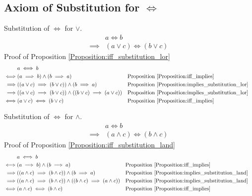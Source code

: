 \subsection{Axiom of Substitution for $\iff$}
\begin{prop}
\label{Proposition:iff_substitution_lor}
Substitution of $\iff$ for $\lor$.
\begin{align*}
& a \iff b \\
\implies & (a \lor c) \iff (b \lor c)
\end{align*}
Proof of Proposition \ref{Proposition:iff_substitution_lor}
\begin{align*}
& a \iff b \\
\iff & (a \implies b) \land (b \implies a)
& & \text{Proposition \ref{Proposition:iff_implies}} \\
\implies & ((a \lor c) \implies (b \lor c)) \land (b \implies a)
& & \text{Proposition \ref{Proposition:implies_substitution_lor}} \\
\implies & ((a \lor c) \implies (b \lor c)) \land ((b \lor c) \implies (a \lor c))
& & \text{Proposition \ref{Proposition:implies_substitution_lor}} \\
\iff & (a \lor c) \iff (b \lor c)
& & \text{Proposition \ref{Proposition:iff_implies}} \\
\end{align*}
\end{prop}

\begin{prop}
\label{Proposition:iff_substitution_land}
Substitution of $\iff$ for $\land$.
\begin{align*}
& a \iff b \\
\implies & (a \land c) \iff (b \land c)
\end{align*}
Proof of Proposition \ref{Proposition:iff_substitution_land}
\begin{align*}
& a \iff b \\
\iff & (a \implies b) \land (b \implies a)
& & \text{Proposition \ref{Proposition:iff_implies}} \\
\implies & ((a \land c) \implies (b \land c)) \land (b \implies a)
& & \text{Proposition \ref{Proposition:implies_substitution_land}} \\
\implies & ((a \land c) \implies (b \land c)) \land ((b \land c) \implies (a \land c))
& & \text{Proposition \ref{Proposition:implies_substitution_land}} \\
\iff & (a \land c) \iff (b \land c)
& & \text{Proposition \ref{Proposition:iff_implies}} \\
\end{align*}
\end{prop}

